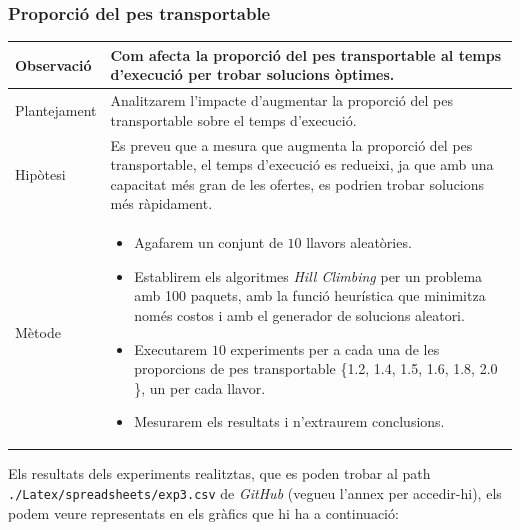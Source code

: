 \documentclass[a4paper]{article}
\begin{document}
	\subsubsection{Proporció del pes transportable}
	\begin{table}[ht]
		\centering
		\begin{tabular}{|l|p{10cm}|}
			\hline
			Observació & Com afecta la proporció del pes transportable al temps d'execució per trobar solucions òptimes.\\
			\hline
			Plantejament & Analitzarem l'impacte d'augmentar la proporció del pes transportable sobre el temps d'execució. \\
			\hline
			Hipòtesi & Es preveu que a mesura que augmenta la proporció del pes transportable, el temps d'execució es redueixi, ja que amb una capacitat més gran de les ofertes, es podrien trobar solucions més ràpidament.\\
			\hline
			Mètode &
			\begin{itemize}
				\item Agafarem un conjunt de $10$ llavors aleatòries.
				\item Establirem els algoritmes \textit{Hill Climbing} per un problema amb 100 paquets, amb la funció heurística que minimitza només costos i amb el generador de solucions aleatori.
				\item Executarem $10$ experiments per a cada una de les proporcions de pes transportable \{1.2, 1.4, 1.5, 1.6, 1.8, 2.0 \}, un per cada llavor.
				\item Mesurarem els resultats i n'extraurem conclusions.
			\end{itemize} \\
			\hline
		\end{tabular}
		\label{tab:exp4a_apartats}
	\end{table}

	Els resultats dels experiments realitztas, que es poden trobar al path \texttt{./Latex/spreadsheets/exp3.csv} de \textit{GitHub} (vegueu l'annex per accedir-hi), els podem veure representats en els gràfics que hi ha a continuació:\\
\end{document}
